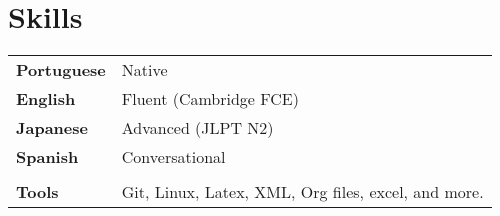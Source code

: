 \documentclass[twocolumn,a4paper,12pt]{article}
\begin{document}
\section{Skills}
\begin{tabularx}{\linewidth}{@{}l X@{}}
  \textbf{Portuguese} & Native \\
  \textbf{English} & Fluent (Cambridge FCE) \\
  \textbf{Japanese} & Advanced (JLPT N2) \\
  \textbf{Spanish} & Conversational \\
  \\
  \textbf{Tools} & Git, Linux, Latex, XML, Org files, excel, and more.
\end{tabularx}

\vfill
{}
\end{document}
